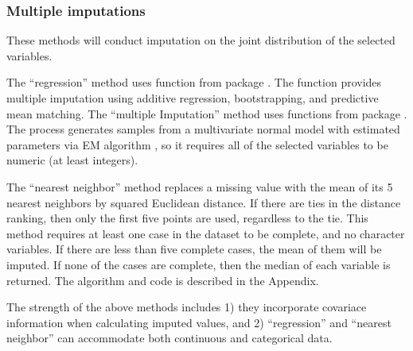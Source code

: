 \documentclass[article]{jss}
\begin{document}
\subsubsection{Multiple imputations}

These methods will conduct imputation on the joint distribution of the selected variables. 

The ``regression'' method uses function  from package . The function provides multiple imputation using additive regression, bootstrapping, and predictive mean matching\citep{hmisc}. The ``multiple Imputation'' method uses functions from package . The process generates samples from a multivariate normal model with estimated parameters via EM algorithm \citep{norm}, so it requires all of the selected variables to be numeric (at least integers).

The ``nearest neighbor'' method replaces a missing value with the mean of its 5 nearest neighbors by squared Euclidean distance. If there are ties in the distance ranking, then only the first five points are used, regardless to the tie. This method requires at least one case in the dataset to be complete, and no character variables. If there are less than five complete cases, the mean of them will be imputed. If none of the cases are complete, then the median of each variable is returned. The algorithm and code is described in the Appendix.

The strength of the above methods includes 1) they incorporate covariace information when calculating imputed values, and  2) ``regression'' and ``nearest neighbor'' can accommodate both continuous and categorical data.
\end{document}
